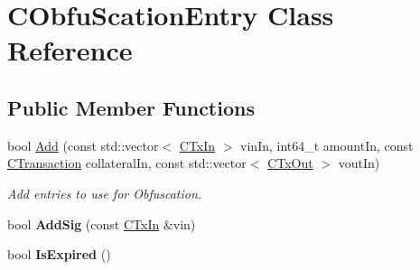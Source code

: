 \hypertarget{class_c_obfu_scation_entry}{}\section{C\+Obfu\+Scation\+Entry Class Reference}
\label{class_c_obfu_scation_entry}
\subsection*{Public Member Functions}
\begin{DoxyCompactItemize}
\item 
\mbox{\label{class_c_obfu_scation_entry_aa3fa2fff3a5f598bbf81cbfa20daeb4c}} 
bool \mbox{\hyperlink{class_c_obfu_scation_entry_aa3fa2fff3a5f598bbf81cbfa20daeb4c}{Add}} (const std\+::vector$<$ \mbox{\hyperlink{class_c_tx_in}{C\+Tx\+In}} $>$ vin\+In, int64\+\_\+t amount\+In, const \mbox{\hyperlink{class_c_transaction}{C\+Transaction}} collateral\+In, const std\+::vector$<$ \mbox{\hyperlink{class_c_tx_out}{C\+Tx\+Out}} $>$ vout\+In)
\begin{DoxyCompactList}\small\item\em Add entries to use for Obfuscation. \end{DoxyCompactList}\item 
\mbox{\label{class_c_obfu_scation_entry_a48c97a9b4f3e8d161c455324989ab0ba}} 
bool {\bfseries Add\+Sig} (const \mbox{\hyperlink{class_c_tx_in}{C\+Tx\+In}} \&vin)
\item 
\mbox{\label{class_c_obfu_scation_entry_a1bf955a94e2b29cc337c31701bbcd04f}} 
bool {\bfseries Is\+Expired} ()
\end{DoxyCompactItemize}
